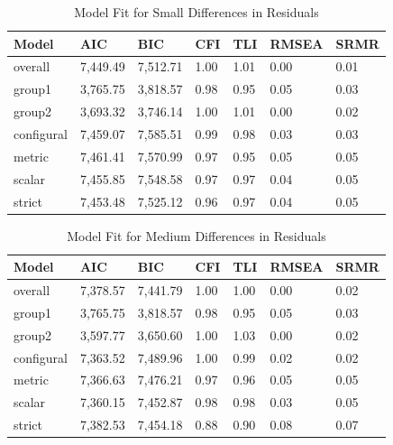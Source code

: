 \documentclass[
  man]{apa6}
\begin{document}
\begin{table}[tbp]

\begin{center}
\begin{threeparttable}

\caption{\label{tab:tab8}Model Fit for Small Differences in Residuals}

\begin{tabular}{lllllll}
\toprule
Model & AIC & BIC & CFI & TLI & RMSEA & SRMR\\
\midrule
overall & 7,449.49 & 7,512.71 & 1.00 & 1.01 & 0.00 & 0.01\\
group1 & 3,765.75 & 3,818.57 & 0.98 & 0.95 & 0.05 & 0.03\\
group2 & 3,693.32 & 3,746.14 & 1.00 & 1.01 & 0.00 & 0.02\\
configural & 7,459.07 & 7,585.51 & 0.99 & 0.98 & 0.03 & 0.03\\
metric & 7,461.41 & 7,570.99 & 0.97 & 0.95 & 0.05 & 0.05\\
scalar & 7,455.85 & 7,548.58 & 0.97 & 0.97 & 0.04 & 0.05\\
strict & 7,453.48 & 7,525.12 & 0.96 & 0.97 & 0.04 & 0.05\\
\bottomrule
\end{tabular}

\end{threeparttable}
\end{center}

\end{table}

\begin{table}[tbp]

\begin{center}
\begin{threeparttable}

\caption{\label{tab:tab9}Model Fit for Medium Differences in Residuals}

\begin{tabular}{lllllll}
\toprule
Model & AIC & BIC & CFI & TLI & RMSEA & SRMR\\
\midrule
overall & 7,378.57 & 7,441.79 & 1.00 & 1.00 & 0.00 & 0.02\\
group1 & 3,765.75 & 3,818.57 & 0.98 & 0.95 & 0.05 & 0.03\\
group2 & 3,597.77 & 3,650.60 & 1.00 & 1.03 & 0.00 & 0.02\\
configural & 7,363.52 & 7,489.96 & 1.00 & 0.99 & 0.02 & 0.02\\
metric & 7,366.63 & 7,476.21 & 0.97 & 0.96 & 0.05 & 0.05\\
scalar & 7,360.15 & 7,452.87 & 0.98 & 0.98 & 0.03 & 0.05\\
strict & 7,382.53 & 7,454.18 & 0.88 & 0.90 & 0.08 & 0.07\\
\bottomrule
\end{tabular}

\end{threeparttable}
\end{center}

\end{table}
\end{document}

